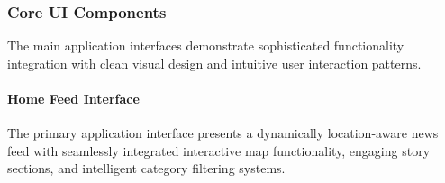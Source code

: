 \subsubsection{Core UI Components}\label{subsubsec:core_ui_components}

The main application interfaces demonstrate sophisticated functionality integration with clean visual design and intuitive user interaction patterns.

\paragraph{Home Feed Interface}
The primary application interface presents a dynamically location-aware news feed with seamlessly integrated interactive map functionality, engaging story sections, and intelligent category filtering systems.

